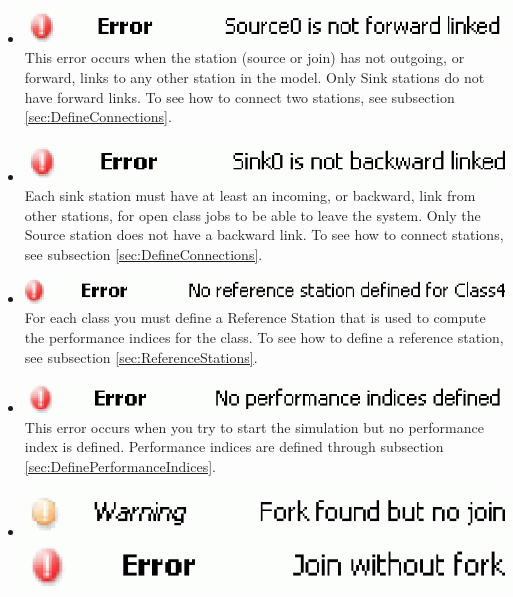 \begin{itemize}
\item \includegraphics[scale=.5]{img/jsim/1.eps}\\
This error occurs when the station (source or join) has not outgoing, or forward, links to any other station in the model. Only Sink stations do not have forward links.
To see how to connect two stations, see subsection \ref{sec:DefineConnections}.
\item \includegraphics[scale=.5]{img/jsim/2.eps}\\
Each sink station must have at least an incoming, or backward, link from other stations, for open class jobs to be able to leave the system. Only the Source station does not have a backward link. To see how to connect stations, see subsection \ref{sec:DefineConnections}.
\item \includegraphics[scale=.5]{img/jsim/3.eps}\\
 For each class you must define a Reference Station that is used to compute the performance indices for the class. To see how to define a reference  station, see subsection \ref{sec:ReferenceStations}.
\item \includegraphics[scale=.5]{img/jsim/4.eps}\\
This error occurs when you try to start the simulation but no performance index is defined. Performance indices are defined through subsection \ref{sec:DefinePerformanceIndices}.
\item \includegraphics[scale=.5]{img/jsim/5.eps}\\
\includegraphics[scale=.5]{img/jsim/9.eps}\\

\end{itemize}
